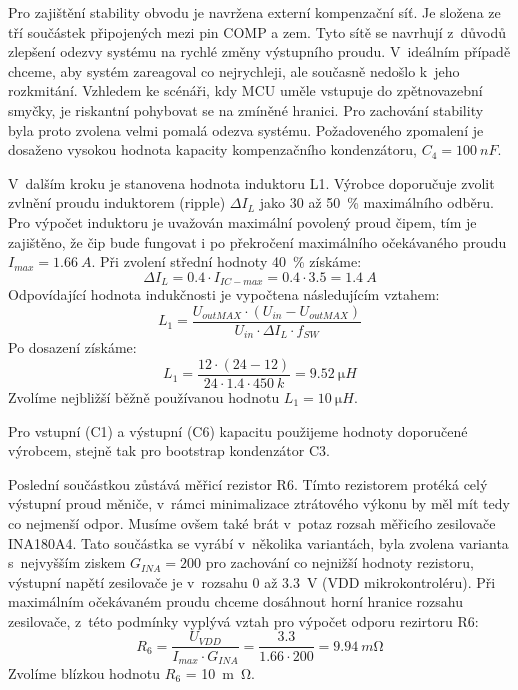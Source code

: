     Pro zajištění stability obvodu je navržena externí kompenzační síť. Je složena ze tří součástek připojených mezi pin COMP a zem. Tyto sítě se navrhují z~důvodů zlepšení odezvy systému na rychlé změny výstupního proudu. V~ideálním případě chceme, aby systém zareagoval co nejrychleji, ale současně nedošlo k~jeho rozkmitání. Vzhledem ke scénáři, kdy MCU uměle vstupuje do zpětnovazební smyčky, je riskantní pohybovat se na zmíněné hranici. Pro zachování stability byla proto zvolena velmi pomalá odezva systému. Požadoveného zpomalení je dosaženo vysokou hodnota kapacity kompenzačního kondenzátoru, \(C_{4}=\qty{100}{nF} \).

    V~dalším kroku je stanovena hodnota induktoru L1. Výrobce doporučuje zvolit zvlnění proudu induktorem (ripple) \(\Delta I_{L}  \) jako 30 až \qty{50}{\percent} maximálního odběru. Pro výpočet induktoru je uvažován maximální povolený proud čipem, tím je zajištěno, že čip bude fungovat i po překročení maximálního očekávaného proudu \(I_{max} = \qty{1.66}{A} \). Při zvolení střední hodnoty \qty{40}{\percent} získáme:
    \begin{equation}
        \Delta I_{L} = \num{0.4}\cdot I_{IC-max} = \num{0.4} \cdot  \num{3.5} = \qty{1.4}{A}
    \end{equation}
    Odpovídající hodnota indukčnosti je vypočtena následujícím vztahem:
    \begin{equation}
        L_{1} = \frac{U_{outMAX}\cdot (U_{in} -U_{outMAX} ) }{U_{in} \cdot \Delta I_{L}\cdot f_{SW}  }
    \end{equation}
    Po dosazení získáme:
    \begin{equation}
        L_{1} = \frac{12\cdot (24 -12 ) }{24 \cdot \num{1.4}\cdot \qty{450}{k}  } = \qty{9.52}{\micro H}
    \end{equation}
    Zvolíme nejbližší běžně používanou hodnotu \(L_{1} = \qty{10}{\micro H}\). 

    Pro vstupní (C1) a výstupní (C6) kapacitu použijeme hodnoty doporučené výrobcem, stejně tak pro bootstrap kondenzátor C3. 
    
    Poslední součástkou zůstává měřicí rezistor R6. Tímto rezistorem protéká celý výstupní proud měniče, v~rámci minimalizace ztrátového výkonu by měl mít tedy co nejmenší odpor. Musíme ovšem také brát v~potaz rozsah měřicího zesilovače INA180A4. Tato součástka se vyrábí v~několika variantách, byla zvolena varianta s~nejvyšším ziskem \(G_{INA}=200 \) pro zachování co nejnižší hodnoty rezistoru, výstupní napětí zesilovače je v~rozsahu 0 až \qty{3.3}{V} (VDD mikrokontroléru).
    Při maximálním očekávaném proudu chceme dosáhnout horní hranice rozsahu zesilovače, z~této podmínky vyplývá vztah pro výpočet odporu rezirtoru R6:
    \begin{equation}
        R_{6} = \frac{U_{VDD}}{I_{max} \cdot G_{INA} } = \frac{\num{3.3}}{\num{1.66}\cdot 200} = \qty{9.94}{m\ohm}
    \end{equation} 
    Zvolíme blízkou hodnotu \(R_{6} \) = \qty{10}{m\ohm}.


